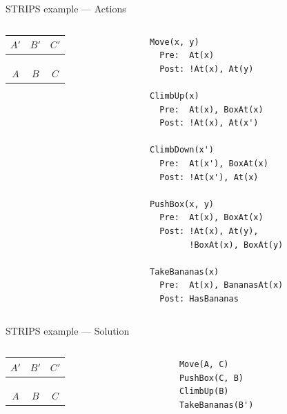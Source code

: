 \begin{frame}[fragile]{STRIPS example --- Actions}
	\begin{columns}
		\begin{column}{0.4\textwidth}
			\begin{tabular}{c|c|c}
				  $A'$  &   $B'$  &   $C'$  \\\hline
				\emptyy & \banana & \emptyy \\
				\emptyy & \emptyy & \emptyy \\
				\monkey & \emptyy & \boxbox \\\hline
				  $A$   &   $B$   &    $C$
			\end{tabular}
		\end{column}
		\begin{column}{0.58\textwidth}
			\begin{lstlisting}
Move(x, y)
  Pre:  At(x)
  Post: !At(x), At(y)

ClimbUp(x)
  Pre:  At(x), BoxAt(x)
  Post: !At(x), At(x')

ClimbDown(x')
  Pre:  At(x'), BoxAt(x)
  Post: !At(x'), At(x)

PushBox(x, y)
  Pre:  At(x), BoxAt(x)
  Post: !At(x), At(y),
        !BoxAt(x), BoxAt(y)

TakeBananas(x)
  Pre:  At(x), BananasAt(x)
  Post: HasBananas
			\end{lstlisting}
		\end{column}
	\end{columns}
\end{frame}

\begin{frame}[fragile]{STRIPS example --- Solution}
	\begin{columns}
		\begin{column}{0.4\textwidth}
			\begin{tabular}{c|c|c}
				  $A'$  &   $B'$  &   $C'$  \\\hline
				\emptyy & \banana & \emptyy \\
				\emptyy & \emptyy & \emptyy \\
				\monkey & \emptyy & \boxbox \\\hline
				  $A$   &   $B$   &    $C$
			\end{tabular}
		\end{column}
		\begin{column}{0.58\textwidth}
			\begin{lstlisting}
Move(A, C)
PushBox(C, B)
ClimbUp(B)
TakeBananas(B')
			\end{lstlisting}
		\end{column}
	\end{columns}
\end{frame}

